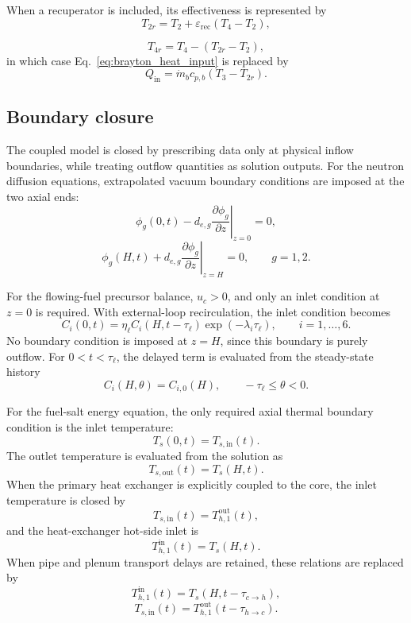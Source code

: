 \documentclass[a4paper,12pt]{article}
\begin{document}
When a recuperator is included, its effectiveness is represented by
\begin{equation}
T_{2r}
=
T_2
+
\varepsilon_{\mathrm{rec}}
\left(
T_4-T_2
\right),
\label{eq:recuperator_cold_out}
\end{equation}

\begin{equation}
T_{4r}
=
T_4
-
\left(
T_{2r}-T_2
\right),
\label{eq:recuperator_hot_out}
\end{equation}
in which case Eq.~\eqref{eq:brayton_heat_input} is replaced by
\begin{equation}
Q_{\mathrm{in}}
=
\dot{m}_b c_{p,b}
\left(
T_3-T_{2r}
\right).
\label{eq:brayton_heat_input_recuperated}
\end{equation}

\subsection{Boundary closure}

The coupled model is closed by prescribing data only at physical inflow
boundaries, while treating outflow quantities as solution outputs.
For the neutron diffusion equations, extrapolated vacuum boundary
conditions are imposed at the two axial ends:
\[
\phi_g(0,t)-d_{e,g}\left.\frac{\partial \phi_g}{\partial z}\right|_{z=0}=0,
\]
\[
\phi_g(H,t)+d_{e,g}\left.\frac{\partial \phi_g}{\partial z}\right|_{z=H}=0,
\qquad g=1,2.
\]

For the flowing-fuel precursor balance, $u_c>0$, and only an inlet
condition at $z=0$ is required. With external-loop recirculation, the
inlet condition becomes
\[
C_i(0,t)
=
\eta_\ell C_i(H,t-\tau_\ell)
\exp(-\lambda_i\tau_\ell),
\qquad i=1,\ldots,6.
\]
No boundary condition is imposed at $z=H$, since this boundary is purely
outflow. For $0<t<\tau_\ell$, the delayed term is evaluated from the
steady-state history
\[
C_i(H,\theta)=C_{i,0}(H),
\qquad -\tau_\ell\leq \theta<0.
\]

For the fuel-salt energy equation, the only required axial thermal
boundary condition is the inlet temperature:
\[
T_s(0,t)=T_{s,\mathrm{in}}(t).
\]
The outlet temperature is evaluated from the solution as
\[
T_{s,\mathrm{out}}(t)=T_s(H,t).
\]
When the primary heat exchanger is explicitly coupled to the core, the
inlet temperature is closed by
\[
T_{s,\mathrm{in}}(t)=T_{h,1}^{\mathrm{out}}(t),
\]
and the heat-exchanger hot-side inlet is
\[
T_{h,1}^{\mathrm{in}}(t)=T_s(H,t).
\]
When pipe and plenum transport delays are retained, these relations are
replaced by
\[
T_{h,1}^{\mathrm{in}}(t)=T_s(H,t-\tau_{c\rightarrow h}),
\]
\[
T_{s,\mathrm{in}}(t)=T_{h,1}^{\mathrm{out}}(t-\tau_{h\rightarrow c}).
\]
\end{document}
